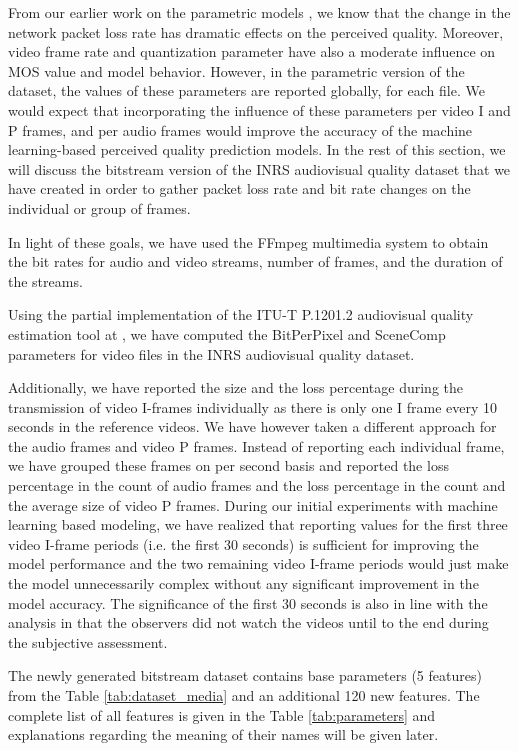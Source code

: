 \documentclass[journal]{IEEEtran}
\begin{document}
From our earlier work on the parametric models \cite{demirbilek2017parametricmodels}, we know that the change in the network packet loss rate has dramatic effects on the perceived quality. Moreover, video frame rate and quantization parameter have also a moderate influence on MOS value and model behavior. However, in the parametric version of the dataset, the values of these parameters are reported globally, for each file. We would expect that incorporating the influence of these parameters per video I and P frames, and per audio frames would improve the accuracy of the machine learning-based perceived quality prediction models. In the rest of this section, we will discuss the bitstream version of the INRS audiovisual quality dataset that we have created in order to gather packet loss rate and bit rate changes on the individual or group of frames. 

In light of these goals, we have used the FFmpeg multimedia system \cite{ffmpeg} to obtain the bit rates for audio and video streams, number of frames, and the duration of the streams.

Using the partial implementation of the ITU-T P.1201.2 audiovisual quality estimation tool at \cite{itut2012P.1201.2_tool}, we have computed the BitPerPixel and SceneComp parameters for video files in the INRS audiovisual quality dataset.

Additionally, we have reported the size and the loss percentage during the transmission of video I-frames individually as there is only one I frame every 10 seconds in the reference videos. We have however taken a different approach for the audio frames and video P frames. Instead of reporting each individual frame, we have grouped these frames on per second basis and reported the loss percentage in the count of audio frames and the loss percentage in the count and the average size of video P frames. During our initial experiments with machine learning based modeling, we have realized that reporting values for the first three video I-frame periods (i.e. the first 30 seconds) is sufficient for improving the model performance and the two remaining video I-frame periods would just make the model unnecessarily complex without any significant improvement in the model accuracy. The significance of the first 30 seconds is also in line with the analysis in \cite{demirbilek2016inrsquality} that the observers did not watch the videos until to the end during the subjective assessment.

The newly generated bitstream dataset contains base parameters (5 features) from the Table \ref{tab:dataset_media} and an additional 120 new features. The complete list of all features is given in the Table \ref{tab:parameters} and explanations regarding the meaning of their names will be given later.
\end{document}
